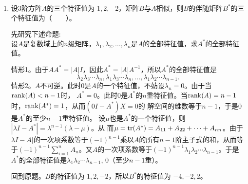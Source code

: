 \begin{enumerate}[1~]
\begin{enumerate}[1.~]
\item
设3阶方阵$A$的三个特征值为 $1, 2, -2$，矩阵$B$与$A$相似，则$B$的伴随矩阵$B^*$的三个特征值为（\ \ \ \ ）。
\begin{solution}
先研究下述命题:\\
设$A$是复数域上的$n$级矩阵，$\lambda_1, \lambda_2, \dots, \lambda_n$是$A$的全部特征值，求$A^*$的全部特征值。
\begin{subsolution}
情形1。由于$A A ^ { * } = | A | I$，因此$ A ^ { * } = | A | A^{-1}$，所以$A^{*}$的全部特征值是\[
\lambda _ { 2 } \lambda _ { 3 } \cdots \lambda _ { n } ,  \lambda _ { 1 } \lambda _ { 3 } \cdots \lambda _ { n } ,  \dots ,  \lambda _ { 1 } \lambda _ { 2 } \cdots \lambda _ { n - 1 }. \]
情形2。$A$不可逆。此时0是$A$的一个特征值，不妨设$
\lambda_n = 0$。由于当${\rm rank}(A) <n-1$时，
$A^*=0$。此时0是$A^*$的$n$重特征值。当${\rm rank}(A) 
=n-1$时，${\rm rank}(A^*)=1$，从而$(0I-A^*)X = 0$的
解空间的维数等于$n-1$，于是0是$A^*$的至少$n-1$重特征值。
设$\mu$也是$A^*$的一个特征值，则$\left| \lambda I - A ^ 
{ * } \right| = \lambda ^ { n - 1 } ( \lambda - \mu )$。从
而$\mu = {\rm tr}(A^*) = A_{11} +A_{22}+ \cdots 
+A_{nn}$。由于$\lambda I-A|$的一次项系数等于$
(-1)^{n-1}$乘以$A$的所有$n-1$阶主子式的和，从而等于$
(-1)^{n-1} \sum_{i=1}^n A_n$。又$A$的一次项系数等于$
(-1)^{n-1} \lambda_1\lambda_2 \cdots \lambda_{n-1}
$。于是$A^*$的全部特征值是$\lambda_1\lambda_2\cdots
\lambda_{n-1}$, $0$（至少$n-1$重）。
\end{subsolution}
回到原题。$B$的特征值为 $1, 2, -2$，所以$B^*$的特征值为 $-4, -2, 2$。
\end{solution}


\end{enumerate}
\end{enumerate}
